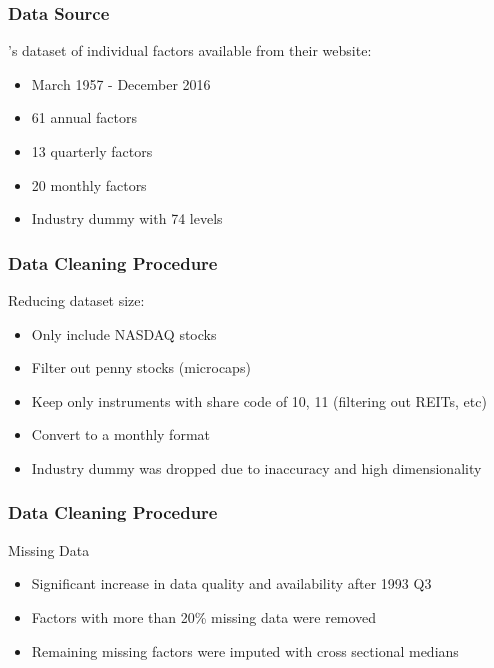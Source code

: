 \documentclass[aspectratio=169]{beamer}
\begin{document}
\begin{frame}
\frametitle{Data Source}
\cite{gu_empirical_2018}'s dataset of individual factors available from their website:
\begin{itemize}
	\item March 1957 - December 2016
	\item 61 annual factors
	\item 13 quarterly factors
	\item 20 monthly factors
	\item Industry dummy with 74 levels
\end{itemize}
\end{frame}

\begin{frame}
\frametitle{Data Cleaning Procedure}
Reducing dataset size:
\begin{itemize}
	\item Only include NASDAQ stocks
	\item Filter out penny stocks (microcaps)
	\item Keep only instruments with share code of 10, 11 (filtering out REITs, etc)
	\item Convert to a monthly format
	\item Industry dummy was dropped due to inaccuracy and high dimensionality
\end{itemize}
\end{frame}

\begin{frame}
\frametitle{Data Cleaning Procedure}
Missing Data
\begin{itemize}
	\item Significant increase in data quality and availability after 1993 Q3
	\item Factors with more than 20\% missing data were removed
	\item Remaining missing factors were imputed with cross sectional medians
\end{itemize}
\end{frame}
\end{document}
